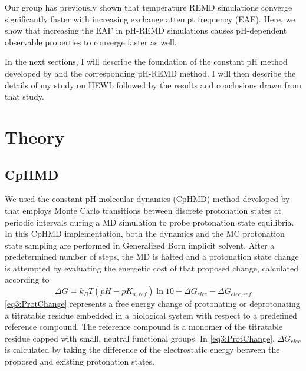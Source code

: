 Our group has previously shown that temperature REMD simulations converge
significantly faster with increasing exchange attempt frequency (EAF).
\cite{Sindhikara2008,Sindhikara2010}  Here, we show that increasing the EAF in
pH-REMD simulations causes pH-dependent observable properties to converge faster
as well.

In the next sections, I will describe the foundation of the constant pH method
developed by \citeauthor{Mongan2004} \cite{Mongan2004} and the corresponding
pH-REMD method. \cite{Itoh2011,Wallace2011} I will then describe the details of
my study on HEWL followed by the results and conclusions drawn from that study.

\section{Theory}

\subsection{CpHMD}

We used the constant pH molecular dynamics (CpHMD) method developed by
\citeauthor{Mongan2004} \cite{Mongan2004} that employs Monte Carlo transitions
between discrete protonation states at periodic intervals during a MD simulation
to probe protonation state equilibria.  In this CpHMD implementation, both the
dynamics and the MC protonation state sampling are performed in Generalized Born
implicit solvent.  After a predetermined number of steps, the MD is halted and a
protonation state change is attempted by evaluating the energetic cost of that
proposed change, calculated according to \cite{Mongan2004}
\begin{equation}
   \Delta G = k _ B T \left( pH - pK _ {a,ref} \right) \ln 10 + \Delta G _
         {elec} - \Delta G _ {elec,ref}
   \label{eq3:ProtChange}
\end{equation}
\ref{eq3:ProtChange} represents a free energy change of protonating or
deprotonating a titratable residue embedded in a biological system with respect
to a predefined reference compound.  The reference compound is a monomer of the
titratable residue capped with small, neutral functional groups.  In
\ref{eq3:ProtChange}, $\Delta G _ {elec}$ is calculated by taking the difference
of the electrostatic energy between the proposed and existing protonation
states. \cite{Mongan2004}

